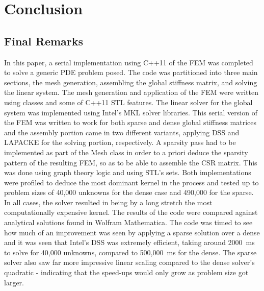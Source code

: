 \clearpage
\chapter{Conclusion}

\section{Final Remarks}

In this paper, a serial implementation using C++11 of the FEM was completed to solve a generic PDE problem posed. The code was partitioned into three main sections, the mesh generation, assembling the global stiffness matrix, and solving the  linear system. The mesh generation and application of the FEM were written using classes and some of C++11 STL features. The linear solver for the global system was implemented using Intel's MKL solver libraries. This serial version of the FEM was written to work for both sparse and dense global stiffness matrices and the assembly portion came in two different variants, applying DSS and LAPACKE for the solving portion, respectively. A sparsity pass had to be implemented as part of the Mesh class in order to a priori deduce the sparsity pattern of the resulting FEM, so as to be able to assemble the CSR matrix. This was done using graph theory logic and using STL's sets. Both implementations were profiled to deduce the most dominant kernel in the process and tested up to problem sizes of 40,000 unknowns for the dense case and 490,000 for the sparse. In all cases, the solver resulted in being by a long stretch the most computationally expensive kernel. The results of the code were compared against analytical solutions found in Wolfram Mathematica. The code was timed to see how much of an improvement was seen by applying a sparse solution over a dense and it was seen that Intel's DSS was extremely efficient, taking around 2000~ms to solve for 40,000 unknowns, compared to 500,000~ms for the dense. The sparse solver also saw far more impressive linear scaling compared to the dense solver's quadratic - indicating that the speed-ups would only grow as problem size got larger.

